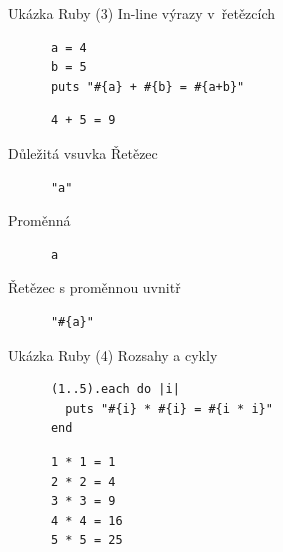 \documentclass{beamer}
\begin{document}
\begin{frame}[fragile]{Ukázka Ruby (3)}
  In-line výrazy v~řetězcích
  \begin{block}{}
    \smallskip \footnotesize
    {\scriptsize \begin{verbatim}
      a = 4
      b = 5
      puts "#{a} + #{b} = #{a+b}"
    \end{verbatim}}
  \end{block}
  \pause
  \begin{block}{}
    \smallskip \footnotesize
    {\scriptsize \begin{verbatim}
      4 + 5 = 9
    \end{verbatim}}
  \end{block}
\end{frame}

\begin{frame}[fragile]{Důležitá vsuvka}
  Řetězec
  \begin{block}{}
    \smallskip \footnotesize
    {\scriptsize \begin{verbatim}
      "a"
    \end{verbatim}}
  \end{block}
  \pause
  Proměnná
  \begin{block}{}
    \smallskip \footnotesize
    {\scriptsize \begin{verbatim}
      a
    \end{verbatim}}
  \end{block}
  \pause
  Řetězec s proměnnou uvnitř
  \begin{block}{}
    \smallskip \footnotesize
    {\scriptsize \begin{verbatim}
      "#{a}"
    \end{verbatim}}
  \end{block}
\end{frame}

\begin{frame}[fragile]{Ukázka Ruby (4)}
  Rozsahy a cykly
  \begin{block}{}
    \smallskip \footnotesize
    {\scriptsize \begin{verbatim}
      (1..5).each do |i|
        puts "#{i} * #{i} = #{i * i}"
      end
    \end{verbatim}}
  \end{block}
  \pause
  \begin{block}{}
    \smallskip \footnotesize
    {\scriptsize \begin{verbatim}
      1 * 1 = 1
      2 * 2 = 4
      3 * 3 = 9
      4 * 4 = 16
      5 * 5 = 25
    \end{verbatim}}
  \end{block}
\end{frame}
\end{document}
